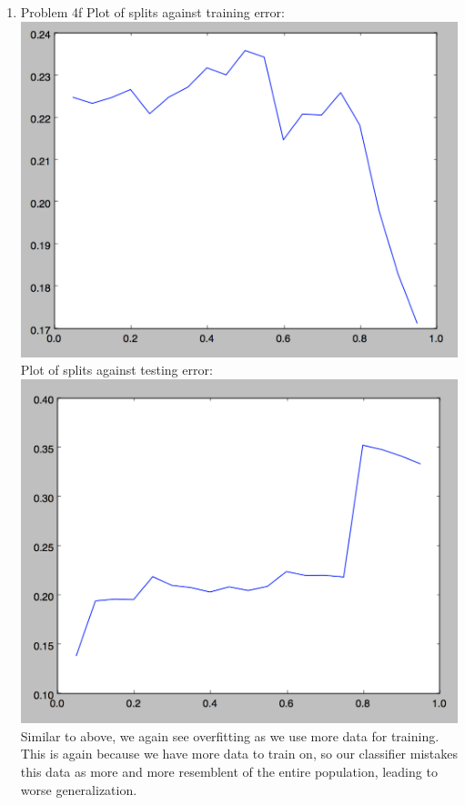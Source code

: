 \documentclass[11pt]{article}
\newcommand{\solution}[1]{{{\color{blue}{\bf Solution:} {#1}}}}
\begin{document}
\begin{enumerate}
{}
\item Problem 4f
\solution{
\newline{}
Plot of splits against training error: 
\newline{}
\includegraphics[scale=0.5]{data_training.png}
\newline{}
Plot of splits against testing error: 
\newline{}
\includegraphics[scale=0.5]{data_test.png}
\newline{}
Similar to above, we again see overfitting as we use more data for training. This is again because we have more data to train on, so our classifier mistakes this data as more and more resemblent of the entire population, leading to worse generalization. 
}
\end{enumerate}
\end{document}
